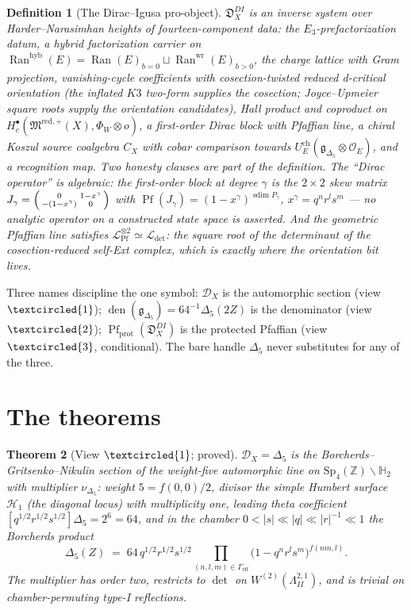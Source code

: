 \documentclass[11pt]{article}
\providecommand{\cD}{\mathcal{D}}
\providecommand{\cL}{\mathcal{L}}
\providecommand{\cO}{\mathcal{O}}
\providecommand{\bZ}{\mathbb{Z}}
\providecommand{\bH}{\mathbb{H}}
\providecommand{\fg}{\mathfrak{g}}
\providecommand{\fD}{\mathfrak{D}}
\providecommand{\fM}{\mathfrak{M}}
\providecommand{\Ran}{\operatorname{Ran}}
\providecommand{\Dfive}{\Delta_5}
\providecommand{\Pf}{\operatorname{Pf}}
\providecommand{\dend}{\operatorname{den}}
\providecommand{\Sp}{\mathrm{Sp}}
\newtheorem{theorem}{Theorem}[section]
\newtheorem{definition}[theorem]{Definition}
\begin{document}
\begin{definition}[The Dirac--Igusa pro-object]
$\fD^{DI}_X$ is an inverse system over Harder--Narasimhan heights of
fourteen-component data: the $E_3$-prefactorization datum, a hybrid
factorization carrier on
$\Ran^{\mathrm{hyb}}(E)=\Ran(E)_{b=0}\sqcup\Ran^{\mathrm{wr}}(E)_{b>0}$,
the charge lattice with Gram projection, vanishing-cycle coefficients
with cosection-twisted reduced d-critical orientation \textup{(the
inflated $K3$ two-form supplies the cosection; Joyce--Upmeier square
roots supply the orientation candidates)}, Hall product and coproduct
on $H^\bullet_c(\fM^{\mathrm{red},+}(X),\Phi_W\otimes o)$, a
first-order Dirac block with Pfaffian line, a chiral Koszul source
coalgebra $C_X$ with cobar comparison towards
$U^{\mathrm{ch}}_E(\fg_{\Dfive}\otimes\cO_E)$, and a recognition map.
Two honesty clauses are part of the definition. The ``Dirac operator''
is algebraic: the first-order block at degree $\gamma$ is the
$2\times2$ skew matrix
$J_\gamma=\begin{psmallmatrix}0&1-x^\gamma\\-(1-x^\gamma)&0
\end{psmallmatrix}$ with
$\Pf(J_\gamma)=(1-x^\gamma)^{\operatorname{sdim}P_\gamma}$,
$x^\gamma=q^nr^ls^m$ --- no analytic operator on a constructed state
space is asserted. And the geometric Pfaffian line satisfies
$\cL_{\Pf}^{\otimes2}\simeq\cL_{\det}$: the square root of the
determinant of the cosection-reduced self-Ext complex, which is
exactly where the orientation bit lives.
\end{definition}

Three names discipline the one symbol: $\cD_X$ is the automorphic
section (view $\textcircled{1}$);
$\dend(\fg_{\Dfive})=64^{-1}\Dfive(2Z)$ is the denominator (view
$\textcircled{2}$); $\Pf_{\mathrm{prot}}(\fD^{DI}_X)$ is the protected
Pfaffian (view $\textcircled{3}$, conditional). The bare handle
$\Dfive$ never substitutes for any of the three.

\section{The theorems}\label{sec:theorems}

\begin{theorem}[View $\textcircled{1}$; proved]\label{thm:view1}
$\cD_X=\Dfive$ is the Borcherds--Gritsenko--Nikulin section of the
weight-five automorphic line on $\Sp_4(\bZ)\backslash\bH_2$ with
multiplier $\nu_{\Dfive}$: weight $5=f(0,0)/2$, divisor the simple
Humbert surface $\mathcal H_1$ \textup{(the diagonal locus)} with
multiplicity one, leading theta coefficient
$[q^{1/2}r^{1/2}s^{1/2}]\Dfive=2^6=64$, and in the chamber
$0<|s|\ll|q|\ll|r|^{-1}\ll1$ the Borcherds product
\[
\Dfive(Z)\;=\;64\,q^{1/2}r^{1/2}s^{1/2}
\prod_{(n,l,m)\in\Gamma_{\mathrm{eff}}}
\bigl(1-q^nr^ls^m\bigr)^{f(nm,l)} .
\]
The multiplier has order two, restricts to $\det$ on
$W^{(2)}(\Lambda^{2,1}_{II})$, and is trivial on chamber-permuting
type-I reflections.
\end{theorem}
\end{document}

